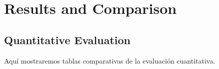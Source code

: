 

\chapter{Results and Comparison}\label{cha:results}



\begin{comment}
  \drop Aquí mostraremos los resultados del modelo final seleccionado (en
  nuestro caso RefVOS). \textbf{No se mostrarán resultados entre diferentes
    iteracciones del modelo}. Lo dividiremos en varias partes, la parte
  cualitativa y la cuantitativa. Compararemos con modelos SOTA siempre y con
  diferentes datasets. La información la puedo sacar del paper de REfvOS y del
  de RelatedWorks.
\end{comment}

\section{Quantitative Evaluation}\label{sec:quantitative-eval}

Aquí mostraremos tablas comparativas de la evaluación cuantitativa.


